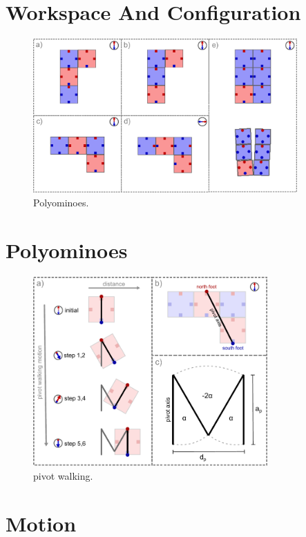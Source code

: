 \section{Workspace And Configuration}


\begin{figure}
	\centering
	\includegraphics[width=0.90\textwidth]{figures/polyominoes.pdf}
	\caption{Polyominoes.}
	\label{fig:polyominoes}
\end{figure}

\section{Polyominoes}


\begin{figure}
	\centering
	\includegraphics[width=0.80\textwidth]{figures/pivot_walking.pdf}
	\caption{pivot walking.}
	\label{fig:pivot_walking}
\end{figure}

\section{Motion}


